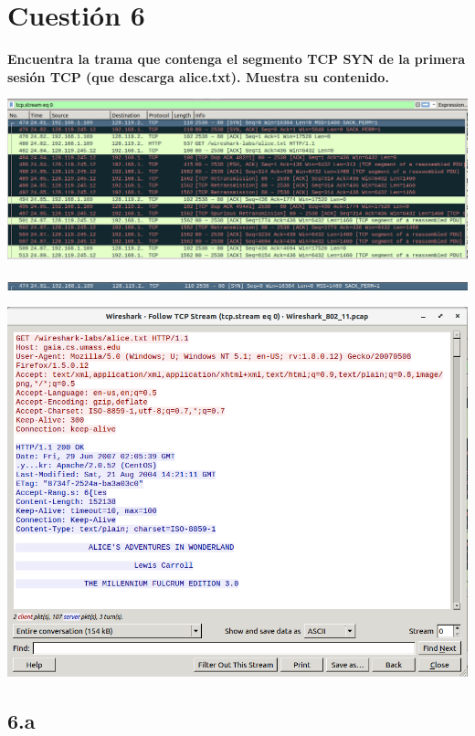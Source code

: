 \documentclass{article}
\begin{document}
\section{Cuestión 6}

\textbf{Encuentra la trama que contenga el segmento TCP SYN de la primera sesión TCP
(que descarga alice.txt). Muestra su contenido.}

\begin{center}
\includegraphics[scale=0.3]{WLAN/flags.png}
\end{center}
\begin{center}
\includegraphics[scale=0.3]{WLAN/packet.png}
\end{center}
\begin{center}
\includegraphics[scale=0.3]{WLAN/txt.png}
\end{center}

\subsection{6.a}
\end{document}
